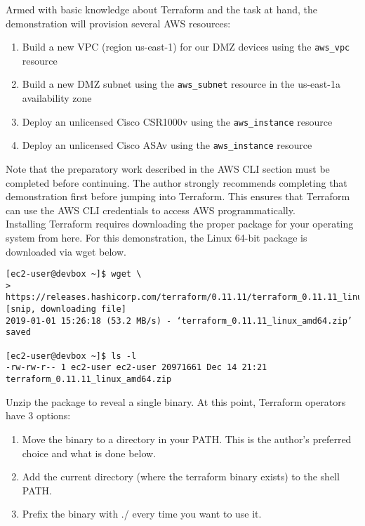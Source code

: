 Armed with basic knowledge about Terraform and the task at hand, the
demonstration will provision several AWS resources:

\begin{enumerate}
  \item	Build a new VPC (region us-east-1) for our DMZ devices using the
  \verb|aws_vpc| resource
  \item	Build a new DMZ subnet using the \verb|aws_subnet| resource in the
  us-east-1a availability zone
  \item	Deploy an unlicensed Cisco CSR1000v using the \verb|aws_instance| resource
  \item	Deploy an unlicensed Cisco ASAv using the \verb|aws_instance| resource
\end{enumerate}

Note that the preparatory work described in the AWS CLI section must be
completed before continuing. The author strongly recommends completing that
demonstration first before jumping into Terraform. This ensures that Terraform
can use the AWS CLI credentials to access AWS programmatically. \\

Installing Terraform requires downloading the proper package for your
operating system from here. For this demonstration, the Linux 64-bit package
is downloaded via wget below.

\begin{verbatim}
[ec2-user@devbox ~]$ wget \
>  https://releases.hashicorp.com/terraform/0.11.11/terraform_0.11.11_linux_amd64.zip
[snip, downloading file]
2019-01-01 15:26:18 (53.2 MB/s) - ‘terraform_0.11.11_linux_amd64.zip’ saved

[ec2-user@devbox ~]$ ls -l
-rw-rw-r-- 1 ec2-user ec2-user 20971661 Dec 14 21:21 terraform_0.11.11_linux_amd64.zip
\end{verbatim}

Unzip the package to reveal a single binary. At this point, Terraform
operators have 3 options:

\begin{enumerate}
  \item	Move the binary to a directory in your PATH. This is the author's
  preferred choice and what is done below.
  \item	Add the current directory (where the terraform binary exists) to the shell PATH.
  \item	Prefix the binary with ./ every time you want to use it.
\end{enumerate}

